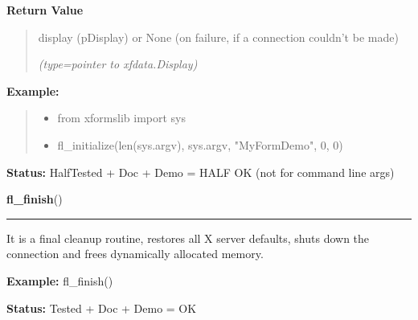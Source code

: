 \begin{boxedminipage}{\funcwidth}
\begin{quote}
      \end{quote}

      \textbf{Return Value}
    \vspace{-1ex}

      \begin{quote}
      display (pDisplay) or None (on failure, if a connection couldn't be 
      made)

      {\it (type=pointer to xfdata.Display)}

      \end{quote}

\textbf{Example:}
\begin{quote}
  \begin{itemize}

  \item
    \setlength{\parskip}{0.6ex}
from xformslib import sys



  \item fl\_initialize(len(sys.argv), sys.argv, "MyFormDemo", 0, 0)



\end{itemize}

\end{quote}

\textbf{Status:} HalfTested + Doc + Demo = HALF OK (not for command line args)



    \end{boxedminipage}

    \label{xformslib:flxbasic:fl_finish}

    \vspace{0.5ex}

\hspace{.8\funcindent}\begin{boxedminipage}{\funcwidth}

    \raggedright \textbf{fl\_finish}()

    \vspace{-1.5ex}

    \rule{\textwidth}{0.5\fboxrule}
\setlength{\parskip}{2ex}
    It is a final cleanup routine, restores all X server defaults, shuts 
    down the connection and frees dynamically allocated memory.

\setlength{\parskip}{1ex}
\textbf{Example:} fl\_finish()



\textbf{Status:} Tested + Doc + Demo = OK



    \end{boxedminipage}

